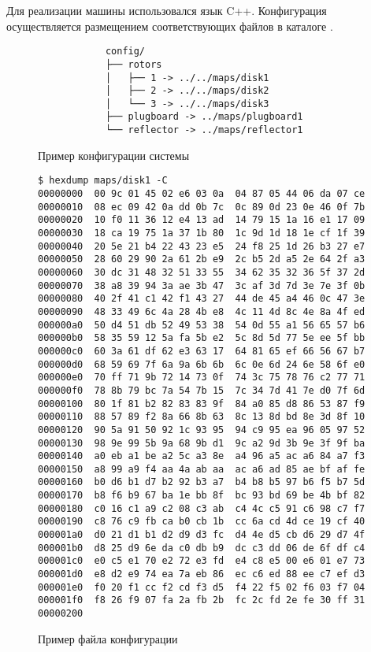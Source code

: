 
Для реализации машины использовался язык C++. Конфигурация осуществляется
размещением соответствующих файлов в каталоге .

\begin{figure}[!h]
    \begin{verbatim}
            config/
            ├── rotors
            │   ├── 1 -> ../../maps/disk1
            │   ├── 2 -> ../../maps/disk2
            │   └── 3 -> ../../maps/disk3
            ├── plugboard -> ../maps/plugboard1
            └── reflector -> ../maps/reflector1
    \end{verbatim}
    \caption{Пример конфигурации системы}
\end{figure}

\clearpage

\begin{figure}[!h]
    \begin{verbatim}
$ hexdump maps/disk1 -C
00000000  00 9c 01 45 02 e6 03 0a  04 87 05 44 06 da 07 ce
00000010  08 ec 09 42 0a dd 0b 7c  0c 89 0d 23 0e 46 0f 7b
00000020  10 f0 11 36 12 e4 13 ad  14 79 15 1a 16 e1 17 09
00000030  18 ca 19 75 1a 37 1b 80  1c 9d 1d 18 1e cf 1f 39
00000040  20 5e 21 b4 22 43 23 e5  24 f8 25 1d 26 b3 27 e7
00000050  28 60 29 90 2a 61 2b e9  2c b5 2d a5 2e 64 2f a3
00000060  30 dc 31 48 32 51 33 55  34 62 35 32 36 5f 37 2d
00000070  38 a8 39 94 3a ae 3b 47  3c af 3d 7d 3e 7e 3f 0b
00000080  40 2f 41 c1 42 f1 43 27  44 de 45 a4 46 0c 47 3e
00000090  48 33 49 6c 4a 28 4b e8  4c 11 4d 8c 4e 8a 4f ed
000000a0  50 d4 51 db 52 49 53 38  54 0d 55 a1 56 65 57 b6
000000b0  58 35 59 12 5a fa 5b e2  5c 8d 5d 77 5e ee 5f bb
000000c0  60 3a 61 df 62 e3 63 17  64 81 65 ef 66 56 67 b7
000000d0  68 59 69 7f 6a 9a 6b 6b  6c 0e 6d 24 6e 58 6f e0
000000e0  70 ff 71 9b 72 14 73 0f  74 3c 75 78 76 c2 77 71
000000f0  78 8b 79 bc 7a 54 7b 15  7c 34 7d 41 7e d0 7f 6d
00000100  80 1f 81 b2 82 83 83 9f  84 a0 85 d8 86 53 87 f9
00000110  88 57 89 f2 8a 66 8b 63  8c 13 8d bd 8e 3d 8f 10
00000120  90 5a 91 50 92 1c 93 95  94 c9 95 ea 96 05 97 52
00000130  98 9e 99 5b 9a 68 9b d1  9c a2 9d 3b 9e 3f 9f ba
00000140  a0 eb a1 be a2 5c a3 8e  a4 96 a5 ac a6 84 a7 f3
00000150  a8 99 a9 f4 aa 4a ab aa  ac a6 ad 85 ae bf af fe
00000160  b0 d6 b1 d7 b2 92 b3 a7  b4 b8 b5 97 b6 f5 b7 5d
00000170  b8 f6 b9 67 ba 1e bb 8f  bc 93 bd 69 be 4b bf 82
00000180  c0 16 c1 a9 c2 08 c3 ab  c4 4c c5 91 c6 98 c7 f7
00000190  c8 76 c9 fb ca b0 cb 1b  cc 6a cd 4d ce 19 cf 40
000001a0  d0 21 d1 b1 d2 d9 d3 fc  d4 4e d5 cb d6 29 d7 4f
000001b0  d8 25 d9 6e da c0 db b9  dc c3 dd 06 de 6f df c4
000001c0  e0 c5 e1 70 e2 72 e3 fd  e4 c8 e5 00 e6 01 e7 73
000001d0  e8 d2 e9 74 ea 7a eb 86  ec c6 ed 88 ee c7 ef d3
000001e0  f0 20 f1 cc f2 cd f3 d5  f4 22 f5 02 f6 03 f7 04
000001f0  f8 26 f9 07 fa 2a fb 2b  fc 2c fd 2e fe 30 ff 31
00000200
    \end{verbatim}
    \caption{Пример файла конфигурации}
\end{figure}

